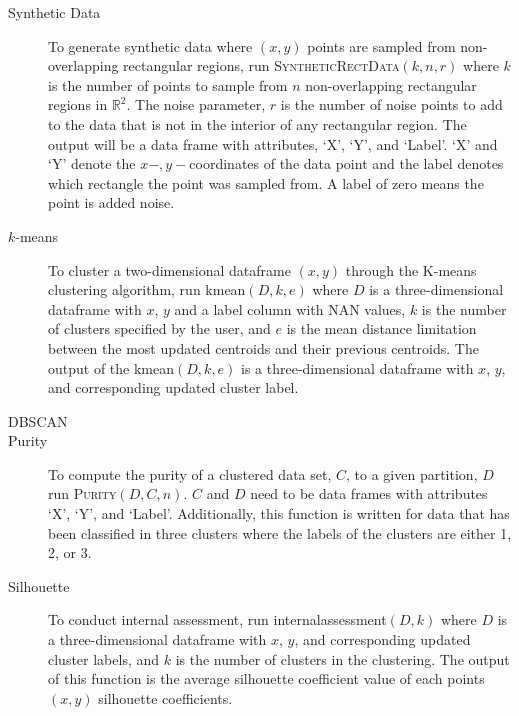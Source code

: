 \documentclass[psamsfonts,onesided,10pt]{amsart}
\begin{document}
\begin{description}
\item[Synthetic Data] To generate synthetic data where $(x,y)$ points are sampled from 
non-overlapping rectangular regions, run \textsc{SyntheticRectData}$(k,n,r)$ where $k$ is the 
number of points to sample from $n$ non-overlapping rectangular regions in $\mathbb{R}^2$. 
The noise parameter, $r$  is the number of noise points to add to the data that is not in the interior 
of any rectangular region. The output will be a data frame with attributes, `X', `Y', and `Label'. 
`X' and `Y' denote the $x-,y-$coordinates of the data point and the label denotes which rectangle 
the point was sampled from. A label of zero means the point is added noise.
\item[$k$-means] To cluster a two-dimensional dataframe $(x,y)$ through the K-means clustering algorithm, run kmean$(D,k,e)$ where $D$ is a three-dimensional dataframe with $x$, $y$ and a label column with NAN values, $k$ is the number of clusters specified by the user, and $e$ is the mean distance limitation between the most updated centroids and their previous centroids. The output of the kmean$(D,k,e)$ is a three-dimensional dataframe with $x$, $y$, and corresponding updated cluster label.\todo{}
\item[DBSCAN] \todo{}
\item[Purity]  To compute the purity of a clustered data set, $C$, to a given partition, $D$ run 
\textsc{Purity}$(D, C, n)$. $C$ and $D$ need to be data frames with 
attributes `X',  `Y', and `Label'. Additionally, this function is written for data that has been 
classified in three clusters where the labels of the clusters are either 1, 2, or 3. 
\item[Silhouette] To conduct internal assessment, run internalassessment$(D,k)$ where $D$ is a three-dimensional dataframe with $x$, $y$, and corresponding updated cluster labels, and $k$ is the number of clusters in the clustering. The output of this function is the average silhouette coefficient value of each points $(x,y)$ silhouette coefficients. \todo{}
\end{description}
 
\end{document}
